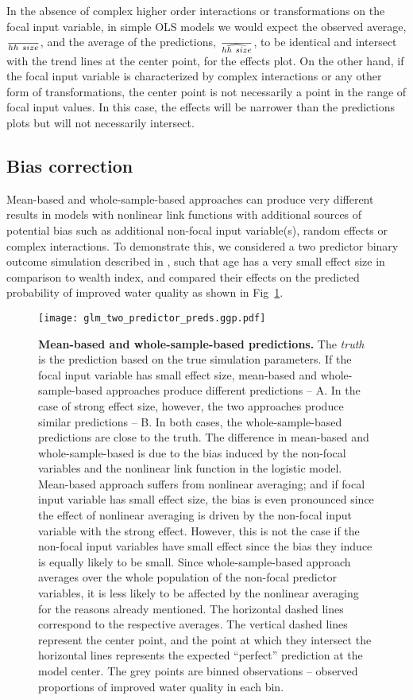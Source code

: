 In the absence of complex higher order interactions or transformations on the focal input variable, in simple OLS models we would expect the observed average, $\over{hh~size}$, and the average of the predictions, $\over{\widehat{hh~size}}$, to be identical and intersect with the trend lines at the center point, for the effects plot. On the other hand, if the focal input variable is characterized by complex interactions or any other form of transformations, the center point is not necessarily a point in the range of focal input values. In this case, the effects will be narrower than the predictions plots but will not necessarily intersect. 


\subsection{Bias correction}

Mean-based and whole-sample-based approaches can produce very different results in models with nonlinear link functions with additional sources of potential bias such as additional non-focal input variable(s), random effects or complex interactions. To demonstrate this, we considered a two predictor binary outcome simulation described in , such that age has a very small effect size in comparison to wealth index, and compared their effects on the predicted probability of improved water quality as shown in Fig~\ref{fig:pred_bin_plots}. 

\begin{figure}
\begin{center}
\texttt{[image: glm\_two\_predictor\_preds.ggp.pdf]}
\end{center}
\caption{{\bf Mean-based and whole-sample-based predictions.} The \emph{truth} is the prediction based on the true simulation parameters. If the focal input variable has small effect size, mean-based and whole-sample-based approaches produce different predictions -- A. In the case of strong effect size, however, the two approaches produce similar predictions -- B. In both cases, the whole-sample-based predictions are close to the truth. The difference in mean-based and whole-sample-based is due to the bias induced by the non-focal variables and the nonlinear link function in the logistic model. Mean-based approach suffers from nonlinear averaging; and if focal input variable has small effect size, the bias is even pronounced since the effect of nonlinear averaging is driven by the non-focal input variable with the strong effect. However, this is not the case if the non-focal input variables have small effect since the bias they induce is equally likely to be small. Since whole-sample-based approach averages over the whole population of the non-focal predictor variables, it is less likely to be affected by the nonlinear averaging for the reasons already mentioned. The horizontal dashed lines correspond to the respective averages. The vertical dashed lines represent the center point, and the point at which they intersect the horizontal lines represents the expected ``perfect'' prediction at the model center. The grey points are binned observations -- observed proportions of improved water quality in each bin.} 
\label{fig:pred_bin_plots}
\end{figure}

